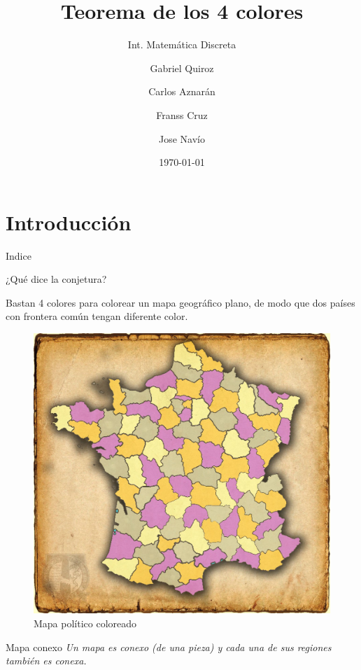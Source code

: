 \documentclass[spanish,utf8]{beamer}
\title{Teorema de los 4 colores}
\subtitle{Int. Matemática Discreta}
\author{Gabriel Quiroz \and Carlos Aznarán \and Franss Cruz \and Jose Navío}
\institute[UNI]{Universidad Nacional de Ingeniería}
\date{\today}
\begin{document}
\maketitle
\section{Introducción}

\begin{frame}{Indice}
\tableofcontents    
\end{frame}

\begin{frame}{¿Qué dice la conjetura?}
\begin{block}{}
Bastan 4 colores para colorear un mapa geográfico
plano, de modo que dos países con frontera común
tengan diferente color.
\end{block}

\begin{minipage}[c]{5cm}
\begin{figure}
    \centering
    \includegraphics[scale=0.08]{mapa-4-colores_HR.jpg}
    \caption{Mapa político coloreado}
\end{figure}
\end{minipage}
\begin{minipage}[c]{5cm}
\begin{block}{Mapa conexo}
\emph{ Un mapa es conexo (de una pieza) y cada una de sus regiones también es conexa.}
\end{block}
\end{minipage}
\end{frame}
\end{document}
